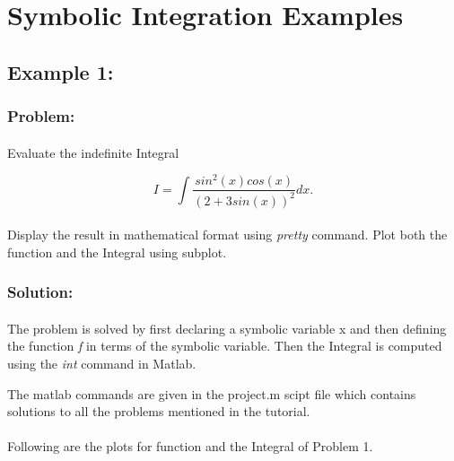 \documentclass[]{article}
\begin{document}


\section{Symbolic Integration Examples}

\subsection{Example 1:  }
\subsubsection{Problem:}
\paragraph{}
Evaluate the indefinite Integral

\[
 I=\int\frac{sin^2(x)cos(x)}{(2+3sin(x))^2}dx.
\]
\paragraph{}
Display the result in mathematical format using \emph{pretty} command. Plot both the function and the Integral using subplot.
\subsubsection{Solution:}
\paragraph{}
The problem is solved by first declaring a symbolic variable x and then defining the function \emph{f} in terms of the symbolic variable. Then the Integral is computed using the \emph{int} command in Matlab. 

The matlab commands are given in the project.m scipt file which contains solutions to all the problems mentioned in the tutorial.
\paragraph{}
Following are the plots for function and the Integral of Problem 1.
\paragraph{}
\end{document}
